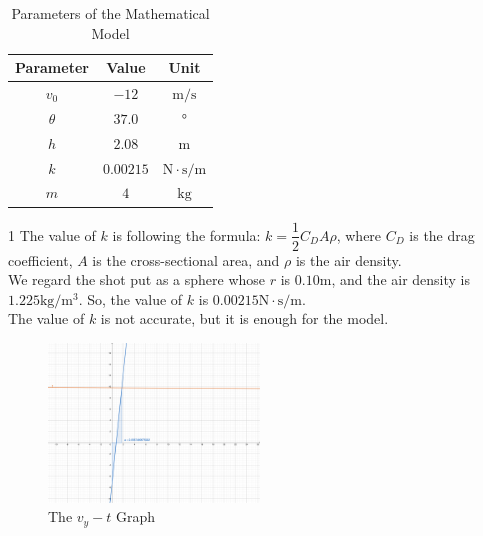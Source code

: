 \documentclass{article}
\begin{document}
\begin{table}[H]
  \centering
  \begin{threeparttable}
    \begin{tabular}{ccc}
      \hline
      \hspace{1cm}\textbf{Parameter}\hspace{1cm} & \hspace{1cm}\textbf{Value}\hspace{1cm} & \hspace{1cm}\textbf{Unit}\hspace{1cm} \\
      \hline
      $v_0$ & $-12$ & $\si{\meter/\second}$ \\
      $\theta$ & $37.0$ & $\si{\degree}$ \\
      $h$ & $2.08$ & $\si{\meter}$ \\
      $k$ & $0.00215$ \tnote{1} & $\si{\newton\cdot\second/\meter}$ \\
      $m$ & $4$ & $\si{\kilo\gram}$ \\
      \hline
    \end{tabular}
    \begin{tablenotes}
      \item [1] The value of $k$ is following the formula: $k=\dfrac{1}{2}C_DA\rho$, where $C_D$ is the drag coefficient, $A$ is the cross-sectional area, and $\rho$ is the air density. \\
      We regard the shot put as a sphere whose $r$ is $0.10 \si{\meter}$, and the air density is $1.225\si{\kilo\gram/\meter^3}$. So, the value of $k$ is $0.00215\si{\newton\cdot\second/\meter}$. \\
      The value of $k$ is not accurate, but it is enough for the model.
    \end{tablenotes}
  \end{threeparttable}
  \label{table:parameters-data}
  \caption{Parameters of the Mathematical Model}
\end{table}

\begin{figure}[H]
    \centering
    \includegraphics[width=0.5\textwidth]{figures/figure-1.pdf}
    \caption{The $v_y-t$ Graph}
    \label{fig:vy-t}
\end{figure}
\end{document}
